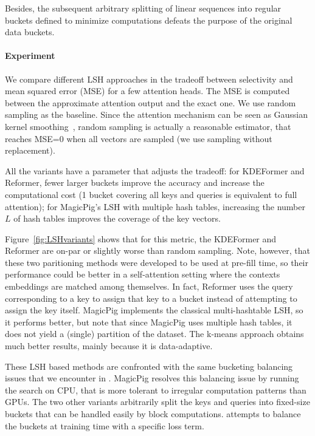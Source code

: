 Besides, the subsequent arbitrary splitting of linear sequences into regular buckets defined to minimize computations defeats the purpose of the original data buckets. 

\paragraph{Experiment}

We compare different LSH approaches in the tradeoff between selectivity and mean squared error (MSE) for a few attention heads. 
The MSE is computed between the approximate attention output and the exact one. 
We use random sampling as the baseline. 
Since the attention mechanism can be seen as Gaussian kernel smoothing~\cite{zhang2024memory}, random sampling is actually a reasonable estimator, that reaches MSE=0 when all vectors are sampled (we use sampling without replacement). 

All the variants have a parameter that adjusts the tradeoff:  
for KDEFormer and Reformer, fewer larger buckets improve the accuracy and increase the computational cost (1 bucket covering all keys and queries is equivalent to full attention); 
for MagicPig's LSH with multiple hash tables, increasing the number $L$ of hash tables improves the coverage of the key vectors. 

Figure~\ref{fig:LSHvariants}  shows that for this metric, the KDEFormer and Reformer are on-par or slightly worse than random sampling. 
Note, however, that these two paritioning methods were developed to be used at pre-fill time, so their performance could be better in a self-attention setting where the contexts embeddings are matched among themselves. 
In fact, Reformer uses the query corresponding to a key to assign that key to a bucket instead of attempting to assign the key itself. 
MagicPig implements the classical multi-hashtable LSH, so it performs better, but note that since MagicPig uses multiple hash tables, it does not yield a (single) partition of the dataset. 
The k-means approach obtains much better results, mainly because it is data-adaptive. 

These LSH based methods are confronted with the same bucketing balancing issues that we encounter in \OURS.
MagicPig resolves this balancing issue by running the search on CPU, that is more tolerant to irregular computation patterns than GPUs. 
The two other variants arbitrarily split the keys and queries into fixed-size buckets that can be handled easily by block computations.  
\OURS attempts to balance the buckets at training time with a specific loss term. 

